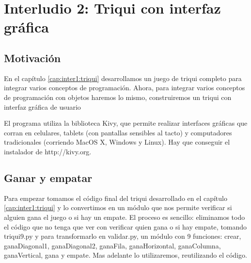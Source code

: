 


\chapter{Interludio 2: Triqui con interfaz gráfica}


\section{Motivación}
En el capítulo \ref{cap:inter1:triqui} desarrollamos un juego de triqui completo
para integrar varios conceptos de programación. Ahora, para integrar varios
conceptos de programación con objetos haremos lo mismo, construiremos un triqui
con interfaz gráfica de usuario

El programa utiliza la biblioteca Kivy, que permite realizar interfaces
gráficas que corran en celulares, tablets (con pantallas sensibles al tacto) 
y computadores tradicionales (corriendo MacOS X, Windows y Linux). Hay que 
conseguir el instalador de http://kivy.org.

\section{Ganar y empatar}
Para empezar tomamos el código final del triqui desarrollado en el capítulo \ref{cap:inter1:triqui}
y lo convertimos en un módulo que nos permite verificar si alguien gana el juego o
si hay un empate. El proceso es sencillo: eliminamos todo el código que no tenga que ver con 
verificar quien gana o si hay empate, tomando triqui9.py y para transformarlo en validar.py, un 
módulo con 9 funciones: crear,  ganaDiagonal1,  ganaDiagonal2, ganaFila, ganaHorizontal, ganaColumna,
ganaVertical, gana y empate. Mas adelante lo utilizaremos, reutilizando el código.

